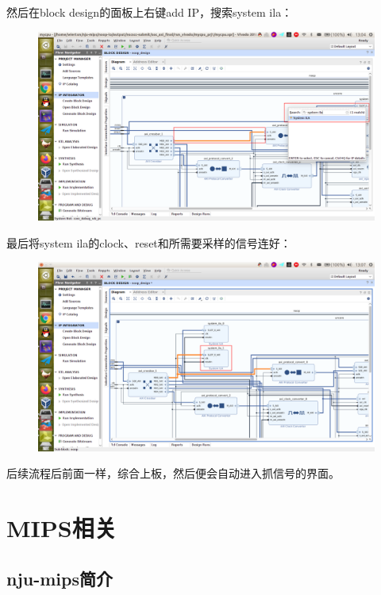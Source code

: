 \documentclass[lang=cn,11pt,a4paper]{elegantpaper}
\begin{document}
然后在block design的面板上右键add IP，搜索system ila：

\begin{figure}[H]
\centering
\includegraphics[width=\linewidth]{image/system_ila_2.png}
\end{figure}

最后将system ila的clock、reset和所需要采样的信号连好：
\begin{figure}[H]
\centering
\includegraphics[width=\linewidth]{image/system_ila_3.png}
\end{figure}

后续流程后前面一样，综合上板，然后便会自动进入抓信号的界面。

\section{MIPS相关}

\subsection{nju-mips简介}
\end{document}
